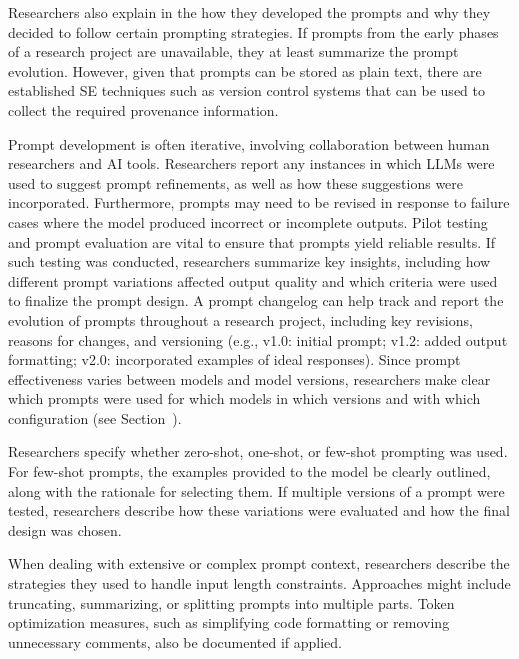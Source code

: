 Researchers \must also explain in the \paper how they developed the prompts and why they decided to follow certain prompting strategies.
If prompts from the early phases of a research project are unavailable, they \must at least summarize the prompt evolution.
However, given that prompts can be stored as plain text, there are established SE techniques such as version control systems that can be used to collect the required provenance information.

Prompt development is often iterative, involving collaboration between human researchers and AI tools.
Researchers \should report any instances in which LLMs were used to suggest prompt refinements, as well as how these suggestions were incorporated.
Furthermore, prompts may need to be revised in response to failure cases where the model produced incorrect or incomplete outputs.
Pilot testing and prompt evaluation are vital to ensure that prompts yield reliable results.
If such testing was conducted, researchers \should summarize key insights, including how different prompt variations affected output quality and which criteria were used to finalize the prompt design.
A prompt changelog can help track and report the evolution of prompts throughout a research project, including key revisions, reasons for changes, and versioning (e.g., v1.0: initial prompt; v1.2: added output formatting; v2.0: incorporated examples of ideal responses).
Since prompt effectiveness varies between models and model versions, researchers \must make clear which prompts were used for which models in which versions and with which configuration (see Section~\modelversion).

Researchers \must specify whether zero-shot, one-shot, or few-shot prompting was used.
For few-shot prompts, the examples provided to the model \should be clearly outlined, along with the rationale for selecting them.
If multiple versions of a prompt were tested, researchers \should describe how these variations were evaluated and how the final design was chosen.

When dealing with extensive or complex prompt context, researchers \must describe the strategies they used to handle input length constraints.
Approaches might include truncating, summarizing, or splitting prompts into multiple parts.
Token optimization measures, such as simplifying code formatting or removing unnecessary comments, \must also be documented if applied.

